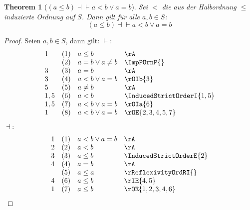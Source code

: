 \documentclass{book}
\theoremstyle{plain}
\newtheorem{theorem}{Theorem}
\theoremstyle{remark}
\theoremstyle{definition}
\begin{document}
\label{LpaLeqbRpEqvaLneqbOraEqualsb}
\begin{theorem}[\((a\leq b)\dashv\vdash a<b\lor a=b\)]
    Sei \(<\) die aus der Halbordnung \(\leq\) induzierte Ordnung auf \(S\). Dann gilt für alle \(a,b\in S\):
    \[
    (a\leq b)\dashv\vdash a<b\lor a=b
    \]
\end{theorem}
\begin{proof}
        Seien \(a,b\in S\), dann gilt:
\(\vdash\):
	\[
        \begin{array}{llll}
            1   &   (1) &   a\leq b             &   \rA                         \\
                &   (2) &   a=b\lor a\neq b     &   \ImpPOrnP{}                 \\
            3   &   (3) &   a=b                 &   \rA                         \\
            3   &   (4) &   a<b\lor a=b         &   \rOIb{3}                    \\
            5   &   (5) &   a\neq b             &   \rA                         \\
            1,5 &   (6) &   a<b                 &   \InducedStrictOrderI{1,5}   \\   
            1,5 &   (7) &   a<b\lor a=b         &   \rOIa{6}                    \\
            1   &   (8) &   a<b\lor a=b         &   \rOE{2,3,4,5,7}             \\
        \end{array}
	\]
 \(\dashv\):
 	\[
        \begin{array}{llll}
            1   &   (1) &   a<b\lor a=b         &   \rA                         \\
            2   &   (2) &   a<b                 &   \rA                         \\
            3   &   (3) &   a\leq b             &   \InducedStrictOrderE{2}     \\
            4   &   (4) &   a=b                 &   \rA                         \\
                &   (5) &   a\leq a             &   \rReflexivityOrdRI{}        \\
            4   &   (6) &   a\leq b             &   \rIE{4,5}                   \\
            1   &   (7) &   a\leq b             &   \rOE{1,2,3,4,6}             \\
        \end{array}
	\]
\end{proof}
\end{document}
